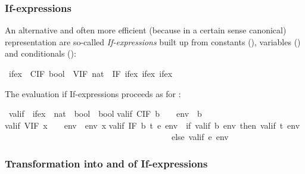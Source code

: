 \begin{isabellebody}
\begin{isamarkuptext}
\subsubsection{If-expressions}

An alternative and often more efficient (because in a certain sense
canonical) representation are so-called \emph{If-expressions} built up
from constants (), variables () and conditionals
():%
\end{isamarkuptext}%
\ ifex\ {\isacharequal}\ CIF\ bool\ {\isacharbar}\ VIF\ nat\ {\isacharbar}\ IF\ ifex\ ifex\ ifex%
\begin{isamarkuptext}%
\noindent
The evaluation if If-expressions proceeds as for :%
\end{isamarkuptext}%
\ valif\ {\isacharcolon}{\isacharcolon}\ {\isachardoublequote}ifex\ {\isasymRightarrow}\ {\isacharparenleft}nat\ {\isasymRightarrow}\ bool{\isacharparenright}\ {\isasymRightarrow}\ bool{\isachardoublequote}\isanewline
{}\isanewline
{\isachardoublequote}valif\ {\isacharparenleft}CIF\ b{\isacharparenright}\ \ \ \ env\ {\isacharequal}\ b{\isachardoublequote}\isanewline
{\isachardoublequote}valif\ {\isacharparenleft}VIF\ x{\isacharparenright}\ \ \ \ env\ {\isacharequal}\ env\ x{\isachardoublequote}\isanewline
{\isachardoublequote}valif\ {\isacharparenleft}IF\ b\ t\ e{\isacharparenright}\ env\ {\isacharequal}\ {\isacharparenleft}if\ valif\ b\ env\ then\ valif\ t\ env\isanewline
\ \ \ \ \ \ \ \ \ \ \ \ \ \ \ \ \ \ \ \ \ \ \ \ \ \ \ \ \ \ \ \ \ \ \ \ \ \ \ \ else\ valif\ e\ env{\isacharparenright}{\isachardoublequote}%
\begin{isamarkuptext}%
\subsubsection{Transformation into and of If-expressions}


\end{isamarkuptext}
\end{isabellebody}
